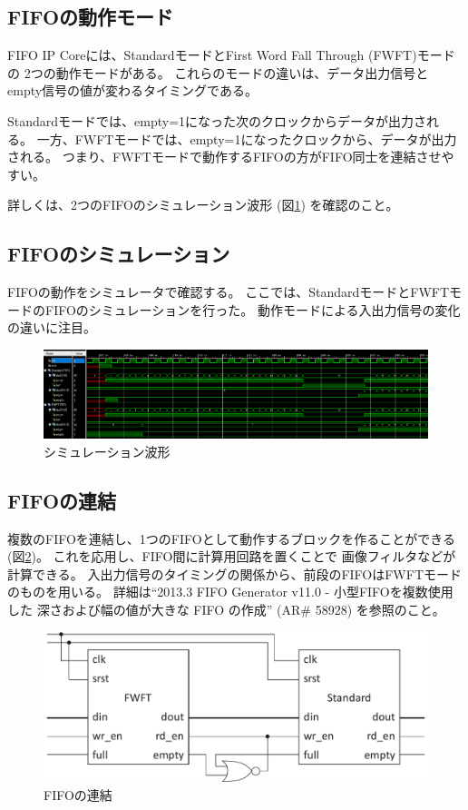 \documentclass[11pt]{jsarticle}
\begin{document}
\subsection*{FIFOの動作モード}
FIFO IP Coreには、StandardモードとFirst Word Fall Through (FWFT)モードの
2つの動作モードがある。
これらのモードの違いは、データ出力信号と
empty信号の値が変わるタイミングである。

Standardモードでは、empty=1になった次のクロックからデータが出力される。
一方、FWFTモードでは、empty=1になったクロックから、データが出力される。
つまり、FWFTモードで動作するFIFOの方がFIFO同士を連結させやすい。

詳しくは、2つのFIFOのシミュレーション波形
(図\ref{img:cmp_fifo}) を確認のこと。

\subsection*{FIFOのシミュレーション}
FIFOの動作をシミュレータで確認する。
ここでは、StandardモードとFWFTモードのFIFOのシミュレーションを行った。
動作モードによる入出力信号の変化の違いに注目。

\begin{figure}[ht]
	\centering
	\includegraphics[width=\linewidth]{../img/cmp_fifo.PNG}
	\caption{シミュレーション波形}
	\label{img:cmp_fifo}
\end{figure}

\vspace{-1cm}

\subsection*{FIFOの連結}
複数のFIFOを連結し、1つのFIFOとして動作するブロックを作ることができる
(図\ref{img:fifo_join})。
これを応用し、FIFO間に計算用回路を置くことで
画像フィルタなどが計算できる。
入出力信号のタイミングの関係から、前段のFIFOはFWFTモードのものを用いる。
詳細は``2013.3 FIFO Generator v11.0 - 小型FIFOを複数使用した
深さおよび幅の値が大きな FIFO の作成'' (AR\# 58928) を参照のこと。

\begin{figure}[ht]
	\centering
	\includegraphics[width=0.5\linewidth]{../img/fifo_join.pdf}
	\caption{FIFOの連結}
	\label{img:fifo_join}
\end{figure}
\end{document}
